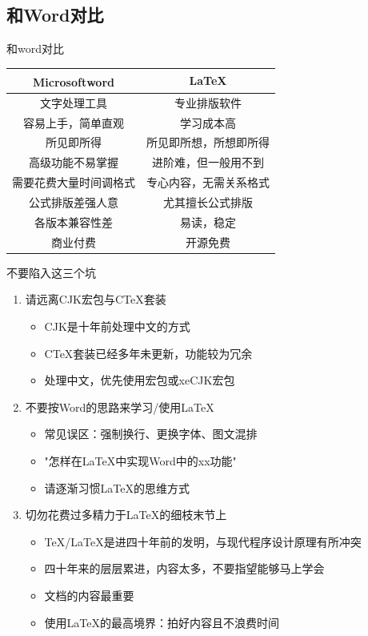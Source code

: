 \documentclass[UTF8,11pt]{beamer}
\begin{document}
\subsection{和Word对比}
\begin{frame}{和word对比}
	\begin{center}
		\begin{tabular}{c|c}
			\hline
			Microsoft\textsuperscript{\textregistered}word & \LaTeX \\
			\hline
			\rowcolor{black!20}
			文字处理工具			& 专业排版软件  \\
			容易上手，简单直观 	  & 学习成本高   \\
			\rowcolor{gray!40}
			所见即所得			 & 所见即所想，所想即所得  \\
			高级功能不易掌握 	   & 进阶难，但一般用不到  \\
			\rowcolor{gray!40}
			需要花费大量时间调格式	& 专心内容，无需关系格式 \\
			公式排版差强人意	  & 尤其擅长公式排版 \\
			\rowcolor{gray!40}
			各版本兼容性差		  & 易读，稳定 \\
			商业付费			& 开源免费 \\
			\hline
		\end{tabular}	
	\end{center}
\end{frame}

\begin{frame}{不要陷入这三个坑}
	\begin{enumerate}
		\item 请远离CJK宏包与CTeX套装
		\begin{itemize}
			\item CJK是十年前处理中文的方式
			\item CTeX套装已经多年未更新，功能较为冗余
			\item 处理中文，优先使用\CTeX 宏包或xeCJK宏包
		\end{itemize}
		\item 不要按Word的思路来学习/使用\LaTeX
		\begin{itemize}
			\item 常见误区：强制换行、更换字体、图文混排
			\item "怎样在\LaTeX 中实现Word中的xx功能"
			\item 请逐渐习惯\LaTeX 的思维方式
		\end{itemize}
		\item 切勿花费过多精力于\LaTeX 的细枝末节上
		\begin{itemize}
			\item \TeX/\LaTeX 是进四十年前的发明，与现代程序设计原理有所冲突
			\item 四十年来的层层累进，内容太多，不要指望能够马上学会
			\item 文档的内容最重要
			\item 使用\LaTeX 的最高境界：拍好内容且不浪费时间
		\end{itemize}
	\end{enumerate}
	
\end{frame}
\end{document}
